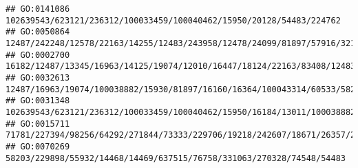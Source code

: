 \documentclass[
]{article}
\begin{document}
\begin{verbatim}
## GO:0141086                                                                                                                                                                                                                                                                                                                                         102639543/623121/236312/100033459/100040462/15950/20128/54483/224762
## GO:0050864                                                                                                                                                                                                                                                                                        12487/242248/12578/22163/14255/12483/243958/12478/24099/81897/57916/321019/72049/208154/69816/16149/20371/16186/12229
## GO:0002700                                                                                                                                                                                                                                                                 16182/12487/13345/16963/14125/19074/12010/16447/18124/22163/83408/12483/243958/69550/81897/215900/22364/327957/58185/69816/16149/20371/12229
## GO:0032613                                                                                                                                                                                                                                                                                                                        12487/16963/19074/100038882/15930/81897/16160/16364/100043314/60533/58205/20371/12229
## GO:0031348                                                                                                                                                                                                                   102639543/623121/236312/100033459/100040462/15950/16184/13011/100038882/246727/23961/23960/246730/109648/80782/16643/243958/434341/237310/16160/80861/81799/54483/547253/21354/21355/20371
## GO:0015711                                                                                                                                                                            71781/227394/98256/64292/271844/73333/229706/19218/242607/18671/26357/20617/14412/26367/11833/11988/382044/104158/13897/56857/102680/215900/216225/16204/20500/18126/12351/76408/20533/218103/50934/21943/69354/20519/24115/12780
## GO:0070269                                                                                                                                                                                                                                                                                                                                        58203/229898/55932/14468/14469/637515/76758/331063/270328/74548/54483

\end{verbatim}
\end{document}
